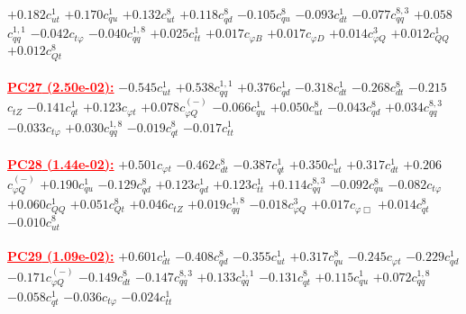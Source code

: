 \documentclass{article}
\begin{document}
{$+0.182$}{\rm $c_{ut}^{1}$}
{$+0.170$}{\rm $c_{qu}^{1}$}
{$+0.132$}{\rm $c_{ut}^{8}$}
{$+0.118$}{\rm $c_{qd}^{8}$}
{$-0.105$}{\rm $c_{qu}^{8}$}
{$-0.093$}{\rm $c_{dt}^{1}$}
{$-0.077$}{\rm $c_{qq}^{8,3}$}
{$+0.058$}{\rm $c_{qq}^{1,1}$}
{$-0.042$}{\rm $c_{t \varphi}$}
{$-0.040$}{\rm $c_{qq}^{1,8}$}
{$+0.025$}{\rm $c_{tt}^{1}$}
{$+0.017$}{\rm $c_{\varphi B}$}
{$+0.017$}{\rm $c_{\varphi D}$}
{$+0.014$}{\rm $c_{\varphi Q}^{3}$}
{$+0.012$}{\rm $c_{QQ}^{1}$}
{$+0.012$}{\rm $c_{Qt}^{8}$}
 \nonumber \\ \nonumber \\
\noindent \textcolor{red}{\underline{\bf{PC27} (2.50e-02):}}
{$-0.545$}{\rm $c_{ut}^{1}$}
{$+0.538$}{\rm $c_{qq}^{1,1}$}
{$+0.376$}{\rm $c_{qd}^{1}$}
{$-0.318$}{\rm $c_{dt}^{1}$}
{$-0.268$}{\rm $c_{dt}^{8}$}
{$-0.215$}{\rm $c_{tZ}$}
{$-0.141$}{\rm $c_{qt}^{1}$}
{$+0.123$}{\rm $c_{\varphi t}$}
{$+0.078$}{\rm $c_{\varphi Q}^{(-)}$}
{$-0.066$}{\rm $c_{qu}^{1}$}
{$+0.050$}{\rm $c_{ut}^{8}$}
{$-0.043$}{\rm $c_{qd}^{8}$}
{$+0.034$}{\rm $c_{qq}^{8,3}$}
{$-0.033$}{\rm $c_{t \varphi}$}
{$+0.030$}{\rm $c_{qq}^{1,8}$}
{$-0.019$}{\rm $c_{qt}^{8}$}
{$-0.017$}{\rm $c_{tt}^{1}$}
 \nonumber \\ \nonumber \\
\noindent \textcolor{red}{\underline{\bf{PC28} (1.44e-02):}}
{$+0.501$}{\rm $c_{\varphi t}$}
{$-0.462$}{\rm $c_{dt}^{8}$}
{$-0.387$}{\rm $c_{qt}^{1}$}
{$+0.350$}{\rm $c_{ut}^{1}$}
{$+0.317$}{\rm $c_{dt}^{1}$}
{$+0.206$}{\rm $c_{\varphi Q}^{(-)}$}
{$+0.190$}{\rm $c_{qu}^{1}$}
{$-0.129$}{\rm $c_{qd}^{8}$}
{$+0.123$}{\rm $c_{qd}^{1}$}
{$+0.123$}{\rm $c_{tt}^{1}$}
{$+0.114$}{\rm $c_{qq}^{8,3}$}
{$-0.092$}{\rm $c_{qu}^{8}$}
{$-0.082$}{\rm $c_{t \varphi}$}
{$+0.060$}{\rm $c_{QQ}^{1}$}
{$+0.051$}{\rm $c_{Qt}^{8}$}
{$+0.046$}{\rm $c_{tZ}$}
{$+0.019$}{\rm $c_{qq}^{1,8}$}
{$-0.018$}{\rm $c_{\varphi Q}^{3}$}
{$+0.017$}{\rm $c_{\varphi \Box}$}
{$+0.014$}{\rm $c_{qt}^{8}$}
{$-0.010$}{\rm $c_{ut}^{8}$}
 \nonumber \\ \nonumber \\
\noindent \textcolor{red}{\underline{\bf{PC29} (1.09e-02):}}
{$+0.601$}{\rm $c_{dt}^{1}$}
{$-0.408$}{\rm $c_{qd}^{8}$}
{$-0.355$}{\rm $c_{ut}^{1}$}
{$+0.317$}{\rm $c_{qu}^{8}$}
{$-0.245$}{\rm $c_{\varphi t}$}
{$-0.229$}{\rm $c_{qd}^{1}$}
{$-0.171$}{\rm $c_{\varphi Q}^{(-)}$}
{$-0.149$}{\rm $c_{dt}^{8}$}
{$-0.147$}{\rm $c_{qq}^{8,3}$}
{$+0.133$}{\rm $c_{qq}^{1,1}$}
{$-0.131$}{\rm $c_{qt}^{8}$}
{$+0.115$}{\rm $c_{qu}^{1}$}
{$+0.072$}{\rm $c_{qq}^{1,8}$}
{$-0.058$}{\rm $c_{qt}^{1}$}
{$-0.036$}{\rm $c_{t \varphi}$}
{$-0.024$}{\rm $c_{tt}^{1}$}
\end{document}
